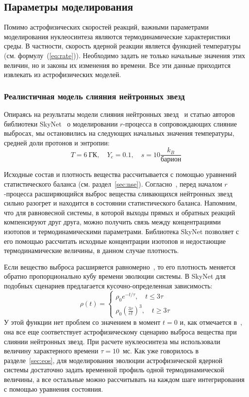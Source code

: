 \subsection{Параметры моделирования}
Помимо астрофизических скоростей реакций, важными параметрами моделирования нуклеосинтеза являются термодинамические характеристики среды. В частности, скорость ядерной реакции является функцией температуры (см. формулу~(\ref{eq:rate})). Необходимо задать не только начальные значения этих величин, но и законы их изменения во времени. Все эти данные приходится извлекать из астрофизических моделей.

\subsubsection{Реалистичная модель слияния нейтронных звезд}
\label{sec:nsm}
Опираясь на результаты модели слияния нейтронных звезд~\cite{korobkin2012} и статью авторов библиотеки SkyNet~\cite{lippuner2015} о моделировании $r$-процесса в сопровождающих слияние выбросах, мы остановились на следующих начальных значения температуры, средней доли протонов и энтропии:
\begin{equation}
\displaystyle
T = 6~\text{ГК},\quad Y_e = 0.1,\quad s = 10 \frac{k_B}{\text{барион}}
\end{equation}

Исходные состав и плотность вещества рассчитывается с помощью уравнений статистического баланса (см. раздел~\ref{sec:nse}). Согласно~\cite{goriely2011,korobkin2012,theilemann2017}, перед началом $r$-процесса расширяющийся выброс вещества сливающихся нейтронных звезд сильно разогрет и находится в состоянии статистического баланса. Напомним, что для равновесной системы, в которой выходы прямых и обратных реакций компенсируют друг друга, можно получить связь между концентрациями изотопов и термодинамическими параметрами. Библиотека SkyNet позволяет с его помощью рассчитать исходные концентрации изотопов и недостающие термодинамические величины, в данном случае плотность.

Если вещество выброса расширяется равномерно~\cite{korobkin2012,lippuner2015}, то его плотность меняется обратно пропорционально кубу времени эволюции системы. В SkyNet для подобных сценариев предлагается кусочно-определенная зависимость:
\begin{equation}
\displaystyle
\rho(t) = \begin{cases}
\rho_0 e^{-t/\tau}, \quad t \leq 3\tau\\
\rho_0 \left( \frac{3\tau}{et} \right)^3, \quad t \geq 3\tau
\end{cases}
\end{equation}
У этой функции нет проблем со значением в момент $t=0$ и, как отмечается в~\cite{lippuner2015}, она все еще соответствует астрофизическому сценарию выброса вещества при слиянии нейтронных звезд. При расчете нуклеосинтеза мы использовали величину характерного времени $\tau = 10$~мс. Как уже говорилось в разделе~\ref{sec:eos}, для моделирования эволюции астрофизической ядерной системы достаточно задать временной профиль одной термодинамической величины, а все остальные можно рассчитывать на каждом шаге интегрирования с помощью уравнения состояния.

